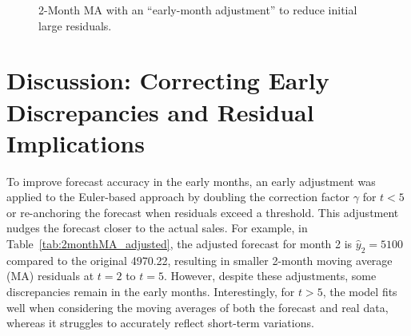 \documentclass{article}
\begin{document}
\begin{figure}[H]
\centering
{}
\caption{2-Month MA with an “early-month adjustment” to reduce initial large residuals.}
\label{fig:2monthMA_early_graph}
\end{figure}
\section{Discussion: Correcting Early Discrepancies and Residual Implications}
\label{sec:discussion}

To improve forecast accuracy in the early months, an early adjustment was applied to the Euler-based approach by doubling the correction factor \(\gamma\) for \(t<5\) or re-anchoring the forecast when residuals exceed a threshold. This adjustment nudges the forecast closer to the actual sales. For example, in Table~\ref{tab:2monthMA_adjusted}, the adjusted forecast for month 2 is \(\hat{y}_2=5100\) compared to the original 4970.22, resulting in smaller 2-month moving average (MA) residuals at \(t=2\) to \(t=5\). However, despite these adjustments, some discrepancies remain in the early months. Interestingly, for \(t>5\), the model fits well when considering the moving averages of both the forecast and real data, whereas it struggles to accurately reflect short-term variations.
\end{document}
